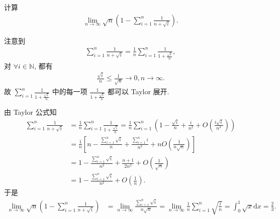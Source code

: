 \documentclass[../../main.tex]{subfiles}
\begin{document}
\begin{example}
计算
\begin{align*}
\lim_{n \to \infty} \sqrt{n} \left( 1 - \sum_{i=1}^n \frac{1}{n + \sqrt{i}} \right).
\end{align*}
\end{example}
\begin{note}
注意到
\begin{align*}
\sum_{i=1}^n \frac{1}{n + \sqrt{i}} = \frac{1}{n} \sum_{i=1}^n \frac{1}{1 + \frac{\sqrt{i}}{n}},
\end{align*}
对 $\forall i \in \mathbb{N}$, 都有
\begin{align*}
\frac{\sqrt{i}}{n} \leqslant \frac{1}{\sqrt{n}} \rightarrow 0, n \rightarrow \infty.
\end{align*}
故 $\sum_{i=1}^n \frac{1}{1 + \frac{\sqrt{i}}{n}}$ 中的每一项 $\frac{1}{1 + \frac{\sqrt{i}}{n}}$ 都可以 Taylor 展开.
\end{note}
\begin{solution}
由 Taylor 公式知
\begin{align*}
\sum_{i=1}^n \frac{1}{n + \sqrt{i}} &= \frac{1}{n} \sum_{i=1}^n \frac{1}{1 + \frac{\sqrt{i}}{n}} = \frac{1}{n} \sum_{i=1}^n \left( 1 - \frac{\sqrt{i}}{n} + \frac{i}{n^2} + O\left( \frac{i\sqrt{i}}{n^3} \right) \right) \\
&= \frac{1}{n} \left[ n - \frac{\sum\limits_{i=1}^n \sqrt{i}}{n} + \frac{\sum\limits_{i=1}^n i}{n^2} + nO\left( \frac{1}{n\sqrt{n}} \right) \right] \\
&= 1 - \frac{\sum\limits_{i=1}^n \sqrt{i}}{n^2} + \frac{n + 1}{2n^2} + O\left( \frac{1}{\sqrt{n}} \right) \\
&= 1 - \frac{\sum\limits_{i=1}^n \sqrt{i}}{n^2} + O\left( \frac{1}{n} \right).
\end{align*}
于是
\begin{align*}
\lim_{n \rightarrow \infty} \sqrt{n} \left( 1 - \sum_{i=1}^n \frac{1}{n + \sqrt{i}} \right) &= \lim_{n \rightarrow \infty} \frac{\sum\limits_{i=1}^n \sqrt{i}}{n\sqrt{n}} = \lim_{n \rightarrow \infty} \frac{1}{n} \sum\limits_{i=1}^n \sqrt{\frac{i}{n}} = \int_0^1 \sqrt{x} \mathrm{d}x = \frac{2}{3}.
\end{align*}
\end{solution}
\end{document}
